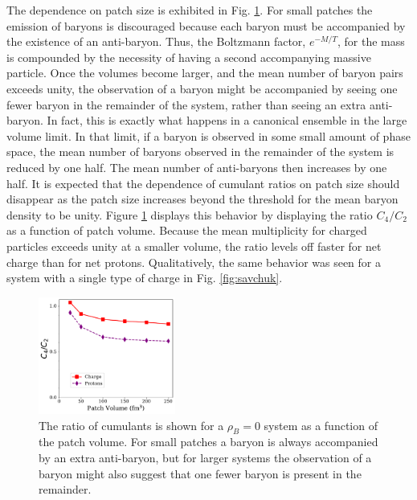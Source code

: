 The dependence on patch size is exhibited in Fig. \ref{fig:uniform_vs_volume}. For small patches the emission of baryons is discouraged because each baryon must be accompanied by the existence of an anti-baryon. Thus, the Boltzmann factor, $e^{-M/T}$, for the mass is compounded by the necessity of having a second accompanying massive particle. Once the volumes become larger, and the mean number of baryon pairs exceeds unity, the observation of a baryon might be accompanied by seeing one fewer baryon in the remainder of the system, rather than seeing an extra anti-baryon. In fact, this is exactly what happens in a canonical ensemble in the large volume limit. In that limit, if a baryon is observed in some small amount of phase space, the mean number of baryons observed in the remainder of the system is reduced by one half. The mean number of anti-baryons then increases by one half. It is expected that the dependence of cumulant ratios on patch size should disappear as the patch size increases beyond the threshold for the mean baryon density to be unity. Figure \ref{fig:uniform_vs_volume} displays this behavior by displaying the ratio $C_4/C_2$ as a function of patch volume. Because the mean multiplicity for charged particles exceeds unity at a smaller volume, the ratio levels off faster for net charge than for net protons. Qualitatively, the same behavior was seen for a system with a single type of charge in Fig. \ref{fig:savchuk}.
\begin{figure}
\centerline{\includegraphics[width=0.4\textwidth]{figs/m_vs_volume}}
\caption{\label{fig:uniform_vs_volume}
The ratio of cumulants is shown for a $\rho_B=0$ system as a function of the patch volume. For small patches a baryon is always accompanied by an extra anti-baryon, but for larger systems the observation of a baryon might also suggest that one fewer baryon is present in the remainder.}
\end{figure}

